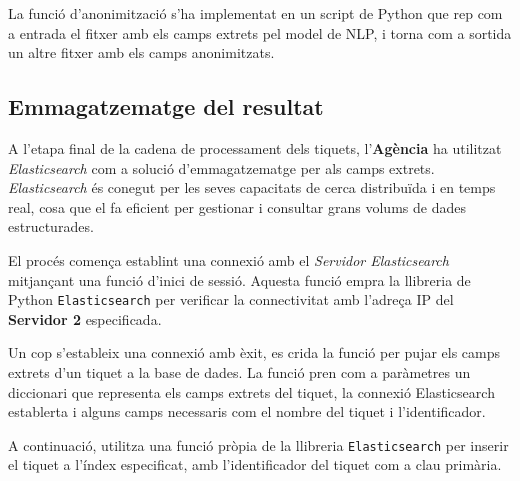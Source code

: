 La funció d'anonimització s'ha implementat en un script de Python que rep com a entrada el fitxer amb els camps extrets pel model de NLP, i torna com a sortida un altre fitxer amb els camps anonimitzats.


\subsection{Emmagatzematge del resultat}
A l'etapa final de la cadena de processament dels tiquets, l'\textbf{Agència} ha utilitzat \textit{Elasticsearch} com a solució d'emmagatzematge per als camps extrets. \textit{Elasticsearch} és conegut per les seves capacitats de cerca distribuïda i en temps real, cosa que el fa eficient per gestionar i consultar grans volums de dades estructurades.

El procés comença establint una connexió amb el \textit{Servidor Elasticsearch} mitjançant una funció d'inici de sessió. Aquesta funció empra la llibreria de Python \texttt{Elasticsearch} per verificar la connectivitat amb l'adreça IP del \textbf{Servidor 2} especificada.

Un cop s'estableix una connexió amb èxit, es crida la funció per pujar els camps extrets d'un tiquet a la base de dades. La funció pren com a paràmetres un diccionari que representa els camps extrets del tiquet, la connexió Elasticsearch establerta i alguns camps necessaris com el nombre del tiquet i l'identificador.

A continuació, utilitza una funció pròpia de la llibreria \texttt{Elasticsearch} per inserir el tiquet a l'índex especificat, amb l'identificador del tiquet com a clau primària.
